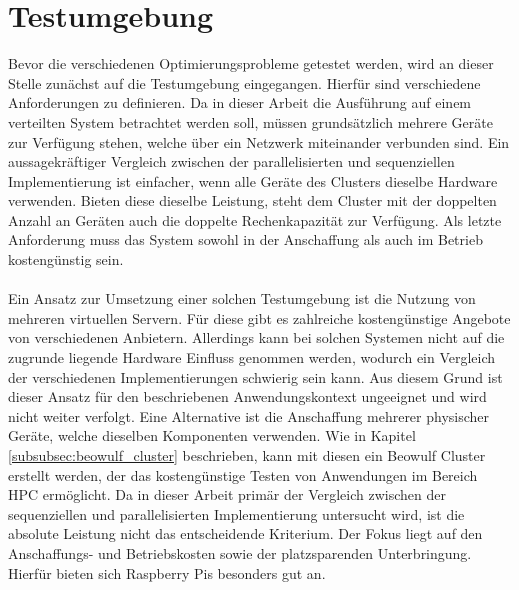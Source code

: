 \section{Testumgebung}
\label{sec:analysis_testsetup}
Bevor die verschiedenen Optimierungsprobleme getestet werden, wird an dieser Stelle zunächst auf die Testumgebung eingegangen. Hierfür sind verschiedene Anforderungen zu definieren. Da in dieser Arbeit die Ausführung auf einem verteilten System betrachtet werden soll, müssen grundsätzlich mehrere Geräte zur Verfügung stehen, welche über ein Netzwerk miteinander verbunden sind. Ein aussagekräftiger Vergleich zwischen der parallelisierten und sequenziellen Implementierung ist einfacher, wenn alle Geräte des Clusters dieselbe Hardware verwenden. Bieten diese dieselbe Leistung, steht dem Cluster mit der doppelten Anzahl an Geräten auch die doppelte Rechenkapazität zur Verfügung. Als letzte Anforderung muss das System sowohl in der Anschaffung als auch im Betrieb kostengünstig sein.
\\\\
Ein Ansatz zur Umsetzung einer solchen Testumgebung ist die Nutzung von mehreren virtuellen Servern. Für diese gibt es zahlreiche kostengünstige Angebote von verschiedenen Anbietern. Allerdings kann bei solchen Systemen nicht auf die zugrunde liegende Hardware Einfluss genommen werden, wodurch ein Vergleich der verschiedenen Implementierungen schwierig sein kann. Aus diesem Grund ist dieser Ansatz für den beschriebenen Anwendungskontext ungeeignet und wird nicht weiter verfolgt. Eine Alternative ist die Anschaffung mehrerer physischer Geräte, welche dieselben Komponenten verwenden. Wie in Kapitel \ref{subsubsec:beowulf_cluster} beschrieben, kann mit diesen ein Beowulf Cluster erstellt werden, der das kostengünstige Testen von Anwendungen im Bereich \ac{HPC} ermöglicht. Da in dieser Arbeit primär der Vergleich zwischen der sequenziellen und parallelisierten Implementierung untersucht wird, ist die absolute Leistung nicht das entscheidende Kriterium. Der Fokus liegt auf den Anschaffungs- und Betriebskosten sowie der platzsparenden Unterbringung. Hierfür bieten sich Raspberry Pis besonders gut an.  
\\\\
